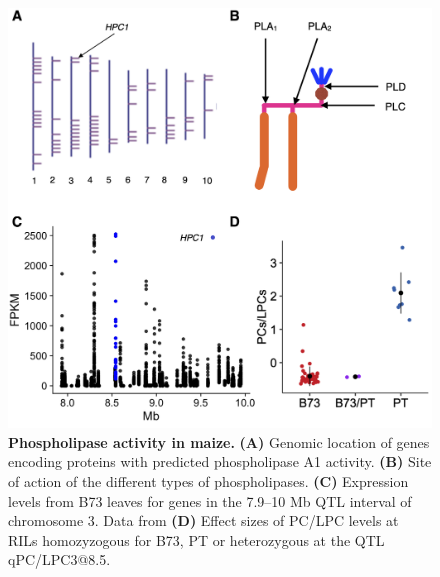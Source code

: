 \begin{figure}[t]
\begin{center}
\includegraphics[width=\linewidth]{Sup_Figures/Sup_Fig_3.png}
\caption[Phospholipase activity in maize.]{\textbf{Phospholipase activity in maize.} \textbf{(A)} Genomic location of genes encoding proteins with predicted phospholipase A1 activity. 
\textbf{(B)} Site of action of the different types of phospholipases.
\textbf{(C)} Expression levels from B73 leaves for genes in the 7.9--10 Mb QTL interval of chromosome 3. Data from \cite{stelpflug2016-vr}
\textbf{(D)} Effect sizes of PC/LPC levels at RILs homozyzogous for B73, PT or heterozygous at the QTL qPC/LPC3@8.5.
}
\label{figure::Sup:HPC1_misc}
\end{center}
\end{figure} 
\clearpage

